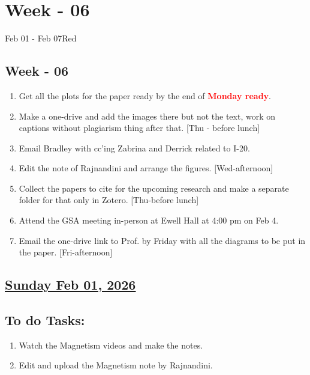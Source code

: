 \section{Week - 06}
\begin{physicsmodule}{Feb 01 - Feb 07}{Red}
  \begin{lawbox}
    \subsection*{\sffamily\bfseries Week - 06}
    \begin{enumerate}
    \item Get all the plots for the paper ready by the end of \textcolor{red}{\textbf{Monday ready}}.
    \item Make a one-drive and add the images there but not the text, work on captions without plagiarism thing after that. [Thu - before lunch]
    \item Email Bradley with cc'ing Zabrina and Derrick related to I-20. \cmark
    \item Edit the note of Rajnandini and arrange the figures. [Wed-afternoon]
    \item Collect the papers to cite for the upcoming research and make a separate folder for that only in Zotero. [Thu-before lunch]
    \item Attend the GSA meeting in-person at Ewell Hall at 4:00 pm on Feb 4.
    \item Email the one-drive link to Prof. by Friday with all the diagrams to be put in the paper. [Fri-afternoon]
\end{enumerate}
  \end{lawbox}
\end{physicsmodule}
\subsection*{\underline{Sunday Feb 01, 2026}}
\subsection*{To do Tasks:}
\begin{enumerate}
   \item Watch the Magnetism videos and make the notes. \cmark 
   \item Edit and upload the Magnetism note by Rajnandini. \cmark
\end{enumerate}
